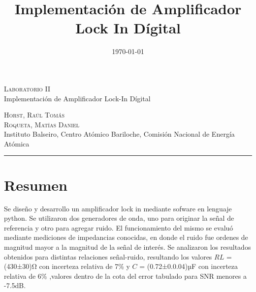 \documentclass[11pt,a4paper]{extarticle}
\date{\small{\today}}
\begin{document}
\title{Implementación de Amplificador Lock In Dígital}
	\LARGE{\textsc{Laboratorio II}}\\
	\Large{Implementación de Amplificador Lock-In Dígital}\\
\begin{large}
\small\textsc{Horst, Raúl Tomás}\\
\small\textsc{Roqueta, Matías Daniel}\\
\small{Instituto Balseiro, Centro Atómico Bariloche, Comisión Nacional de Energía Atómica}\\
\end{large}
\setcounter{page}{1}

\chead{}

\rfoot{\thepage} 
\renewcommand{\headrulewidth}{0.4pt} 
\renewcommand{\footrulewidth}{0.4pt} 
\pagestyle{fancy}

\hrule
\normalsize
\section{Resumen}
Se diseño y desarrollo un amplificador lock in 
mediante sofware en lenguaje python. 
Se utilizaron dos generadores de onda, uno para originar 
la señal de referencia y otro para agregar ruido. 
El funcionamiento del mismo se evaluó mediante 
mediciones de impedancias conocidas, en donde el ruido 
fue ordenes de magnitud mayor a la magnitud de la señal 
de interés. Se analizaron los
resultados obtenidos para distintas relaciones 
señal-ruido, resultando los valores $RL$ = (430±30)Ω con 
incerteza relativa de 7\% y
$C$ = (0.72±0.0.04)µF con incerteza relativa de 6\% 
,valores dentro de la cota del error tabulado para 
SNR menores a -7.5dB.
\end{document}
